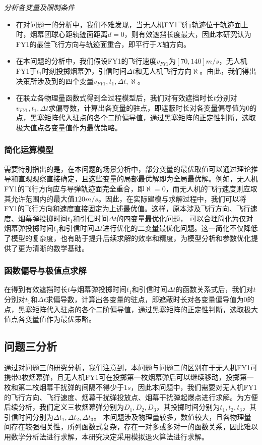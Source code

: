 \documentclass{article}
\begin{document}
\textit{分析各变量及限制条件}
\begin{itemize}
    \item 在对问题一的分析中，我们不难发现，当无人机FY1飞行轨迹位于轨迹面上时，烟幕团球心距轨迹面距离$d=0$，则有效遮挡长度最大，因此本研究认为FY1的最佳飞行方向与轨迹面重合，即平行于$X$轴方向。
    \item 在本问题的分析中，我们假设FY1的飞行速度$v_{FY1}$为$[70,140]m/s$，无人机FY1于$t_1$时刻投掷烟幕弹，引信时间$\Delta t$和无人机飞行方向$\aleph$。由此，我们得出决策所涉及到的四个变量$v_{FY1},t_1,\Delta t,\aleph$。
    \item 在联立各物理量函数式得到全过程模型后，我们对有效遮挡时长$t$分别对$v_{FY1},t_1,\Delta t$求偏导数，计算出各变量的驻点，即遮蔽时长对各变量偏导值为0的点，黑塞矩阵代入驻点的各个二阶偏导值，通过黑塞矩阵的正定性判断，选取极大值点各变量值作为最优策略。
\end{itemize}

\subsubsection{简化运算模型}

需要特别指出的是，在本问题的场景分析中，部分变量的最优取值可以通过理论推导和直观观察直接确定，且这些变量的局部最优解即为全局最优解。例如，无人机FY1的飞行方向应与导弹轨迹面完全重合，即$\aleph = 0$，而无人机的飞行速度则应取其允许范围内的最大值$120m/s$。因此，在实际建模与求解过程中，我们可以将FY1的飞行方向和速度直接固定为上述最优值。这样，原本涉及飞行方向、飞行速度、烟幕弹投掷时间$t_1$和引信时间$\Delta t$的四变量最优化问题，
可以合理简化为仅对烟幕弹投掷时间$t_1$和引信时间$\Delta t$进行优化的二变量最优化问题。这一简化不仅降低了模型的复杂度，也有助于提升后续求解的效率和精度，为模型分析和参数优化提供了更为清晰的数学基础。

\subsubsection{函数偏导与极值点求解}
在得到有效遮挡时长$t$与烟幕弹投掷时间$t_1$和引信时间$\Delta t$的函数关系式后，我们对$t$分别对$t_1$和$\Delta t$求偏导数，计算出各变量的驻点，即遮蔽时长对各变量偏导值为0的点，黑塞矩阵代入驻点的各个二阶偏导值，通过黑塞矩阵的正定性判断，选取极大值点各变量值作为最优策略。


\subsection{问题三分析}
通过对问题三的研究分析，我们注意到，本问题与问题二的区别在于无人机FY1可携带3枚烟幕弹，且无人机FY1可在投掷第一枚烟幕弹后可以继续移动，投掷第一枚和第二枚烟幕干扰弹的间隔不得少于$1s$，因此本问题中，我们需要对无人机FY1的飞行方向、飞行速度、烟幕干扰弹投放点、烟幕干扰弹起爆点进行求解。为方便后续分析，我们定义三枚烟幕弹分别为$D_1,D_2,D_3$，其投掷时间分别为$t_1,t_2,t_3$，其引信时间分别为$\Delta t_1,\Delta t_2,\Delta t_3$。
本问题涉及物理量较多，数值较大，且各物理量间存在较强相关性，所列函数式复杂，存在一对多或多对一的函数关系，因此难以用数学分析法进行求解，本研究决定采用模拟退火算法进行求解。
\end{document}
